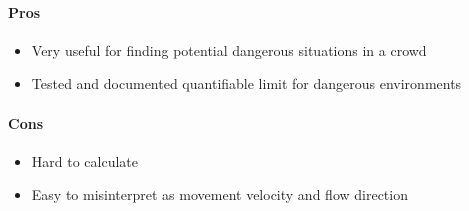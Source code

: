 
\paragraph{Pros}
\begin{itemize}
    \item Very useful for finding potential dangerous situations in a crowd
    \item Tested and documented quantifiable limit for dangerous environments
\end{itemize}

\paragraph{Cons}
\begin{itemize}
    \item Hard to calculate
    \item Easy to misinterpret as movement velocity and flow direction
\end{itemize}